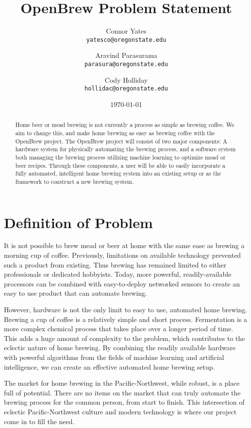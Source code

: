 \documentclass[letterpaper,10pt]{article}
\author{Connor Yates\\
\texttt{yatesco@oregonstate.edu}
\and
Aravind Parasurama\\
\texttt{parasura@oregonstate.edu}
\and
Cody Holliday\\
\texttt{hollidac@oregonstate.edu}}
\date{\today}
\title{OpenBrew Problem Statement}
\begin{document}
\maketitle

\begin{abstract}
	Home beer or mead brewing is not currently a process as simple as brewing coffee.
	We aim to change this, and make home brewing as easy as brewing coffee with the OpenBrew project.
	The OpenBrew project will consist of two major components:
	A hardware system for physically automating the brewing process, and a software system both managing the brewing process utilizing machine learning to optimize mead or beer recipes.
	Through these components, a user will be able to easily incorporate a fully automated, intelligent home brewing system into an existing setup or as the framework to construct a new brewing system.
\end{abstract}

\newpage

\section{Definition of Problem}
It is not possible to brew mead or beer at home with the same ease as brewing a morning cup of coffee.
Previously, limitations on available technology prevented such a product from existing.
Thus brewing has remained limited to either professionals or dedicated hobbyists.
Today, more powerful, readily-available processors can be combined with easy-to-deploy networked sensors to create an easy to use product that can automate brewing.

However, hardware is not the only limit to easy to use, automated home brewing. 
Brewing a cup of coffee is a relatively simple and short process.
Fermentation is a more complex chemical process that takes place over a longer period of time.
This adds a huge amount of complexity to the problem, which contributes to the eclectic nature of home brewing.
By combining the readily available hardware with powerful algorithms from the fields of machine learning and artificial intelligence, we can create an effective automated home brewing setup.

The market for home brewing in the Pacific-Northwest, while robust, is a place full of potential.
There are no items on the market that can truly automate the brewing process for the common person, from start to finish.
This intersection of eclectic Pacific-Northwest culture and modern technology is where our project come in to fill the need.
\end{document}
